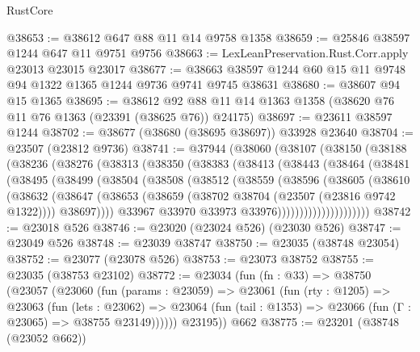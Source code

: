 \begin{lexlean}{RustCore}
\begin{coremodule}
@38653 := @38612 @647 @88 @11 @14 @9758 @1358
@38659 := @25846 @38597 @1244 @647 @11 @9751 @9756
@38663 := LexLeanPreservation.Rust.Corr.apply @23013 @23015 @23017
@38677 := @38663 @38597 @1244 @60 @15 @11 @9748 @94 @1322 @1365 @1244 @9736 @9741 @9745 @38631
@38680 := @38607 @94 @15 @1365
@38695 := @38612 @92 @88 @11 @14 @1363 @1358 (@38620 @76 @11 @76 @1363 (@23391 (@38625 @76)) @24175)
@38697 := @23611 @38597 @1244
@38702 := @38677 (@38680 (@38695 @38697)) @33928 @23640
@38704 := @23507 (@23812 @9736)
@38741 := @37944
    (@38060
      (@38107
        (@38150
          (@38188
            (@38236
              (@38276
                (@38313
                  (@38350
                    (@38383
                      (@38413
                        (@38443
                          (@38464
                            (@38481
                              (@38495
                                (@38499
                                  (@38504
                                    (@38508
                                      (@38512
                                        (@38559
                                          (@38596
                                            (@38605
                                              (@38610
                                                (@38632
                                                  (@38647
                                                    (@38653
                                                      (@38659
                                                        (@38702
                                                          @38704
                                                          (@23507 (@23816 @9742 @1322))))
                                                      @38697))))
                                              @33967
                                              @33970
                                              @33973
                                              @33976)))))))))))))))))))))
@38742 := @23018 @526
@38746 := @23020 (@23024 @526) (@23030 @526)
@38747 := @23049 @526
@38748 := @23039 @38747
@38750 := @23035 (@38748 @23054)
@38752 := @23077 (@23078 @526)
@38753 := @23073 @38752
@38755 := @23035 (@38753 @23102)
@38772 := @23034
    (fun (fn : @33) =>
    @38750
      (@23057
        (@23060
          (fun (params : @23059) =>
          @23061
            (fun (rty : @1205) =>
            @23063
              (fun (lets : @23062) =>
              @23064 (fun (tail : @1353) => @23066 (fun (Γ : @23065) => @38755 @23149))))))
        @23195))
    @662
@38775 := @23201 (@38748 (@23052 @662))

\end{coremodule}
\end{lexlean}
